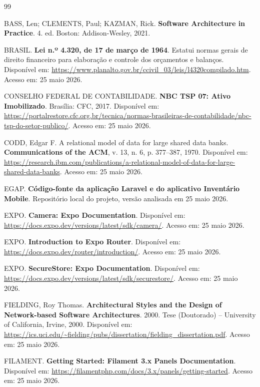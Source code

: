 \documentclass[12pt,a4paper]{article}
\begin{document}
\clearpage
{}
\begin{thebibliography}{99}

BASS, Len; CLEMENTS, Paul; KAZMAN, Rick.
\textbf{Software Architecture in Practice}. 4. ed. Boston: Addison-Wesley,
2021.

BRASIL. \textbf{Lei n.º 4.320, de 17 de março de 1964}. Estatui normas gerais
de direito financeiro para elaboração e controle dos orçamentos e balanços.
Disponível em:
\url{https://www.planalto.gov.br/ccivil_03/leis/l4320compilado.htm}.
Acesso em: 25 maio 2026.

CONSELHO FEDERAL DE CONTABILIDADE. \textbf{NBC TSP 07: Ativo Imobilizado}.
Brasília: CFC, 2017. Disponível em:
\url{https://portalrestore.cfc.org.br/tecnica/normas-brasileiras-de-contabilidade/nbc-tsp-do-setor-publico/}.
Acesso em: 25 maio 2026.

CODD, Edgar F. A relational model of data for large shared data banks.
\textbf{Communications of the ACM}, v. 13, n. 6, p. 377--387, 1970.
Disponível em:
\url{https://research.ibm.com/publications/a-relational-model-of-data-for-large-shared-data-banks}.
Acesso em: 25 maio 2026.

EGAP. \textbf{Código-fonte da aplicação Laravel e do aplicativo Inventário
Mobile}. Repositório local do projeto, versão analisada em 25 maio 2026.

EXPO. \textbf{Camera: Expo Documentation}. Disponível em:
\url{https://docs.expo.dev/versions/latest/sdk/camera/}.
Acesso em: 25 maio 2026.

EXPO. \textbf{Introduction to Expo Router}. Disponível em:
\url{https://docs.expo.dev/router/introduction/}.
Acesso em: 25 maio 2026.

EXPO. \textbf{SecureStore: Expo Documentation}. Disponível em:
\url{https://docs.expo.dev/versions/latest/sdk/securestore/}.
Acesso em: 25 maio 2026.

FIELDING, Roy Thomas. \textbf{Architectural Styles and the Design of
Network-based Software Architectures}. 2000. Tese (Doutorado) -- University of
California, Irvine, 2000. Disponível em:
\url{https://ics.uci.edu/~fielding/pubs/dissertation/fielding_dissertation.pdf}.
Acesso em: 25 maio 2026.

FILAMENT. \textbf{Getting Started: Filament 3.x Panels Documentation}.
Disponível em:
\url{https://filamentphp.com/docs/3.x/panels/getting-started}.
Acesso em: 25 maio 2026.


\end{thebibliography}
\end{document}
